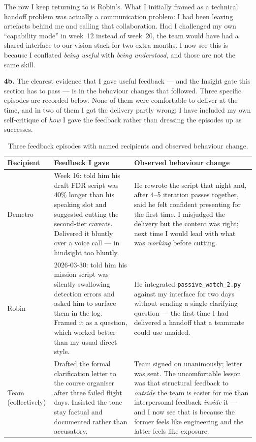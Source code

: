 The row I keep returning to is Robin's. What I initially framed as a technical handoff problem was actually a communication problem: I had been leaving artefacts behind me and calling that collaboration. Had I challenged my own ``capability mode'' in week~12 instead of week~20, the team would have had a shared interface to our vision stack for two extra months. I now see this is because I conflated \emph{being useful} with \emph{being understood}, and those are not the same skill.

\textbf{4b.} The clearest evidence that I gave useful feedback --- and the Insight gate this section has to pass --- is in the behaviour changes that followed. Three specific episodes are recorded below. None of them were comfortable to deliver at the time, and in two of them I got the delivery partly wrong; I have included my own self-critique of \emph{how} I gave the feedback rather than dressing the episodes up as successes.

\begin{table}[h]
\small
\centering
\begin{tabular}{@{}p{2cm}p{5cm}p{6.5cm}@{}}
\toprule
\textbf{Recipient} & \textbf{Feedback I gave} & \textbf{Observed behaviour change} \\
\midrule
Demetro & Week 16: told him his draft FDR script was 40\% longer than his speaking slot and suggested cutting the second-tier caveats. Delivered it bluntly over a voice call --- in hindsight too bluntly. & He rewrote the script that night and, after 4--5 iteration passes together, said he felt confident presenting for the first time. I misjudged the delivery but the content was right; next time I would lead with what was \emph{working} before cutting. \\
Robin & 2026-03-30: told him his mission script was silently swallowing detection errors and asked him to surface them in the log. Framed it as a question, which worked better than my usual direct style. & He integrated \texttt{passive\_watch\_2.py} against my interface for two days without sending a single clarifying question --- the first time I had delivered a handoff that a teammate could use unaided. \\
Team (collectively) & Drafted the formal clarification letter to the course organiser after three failed flight days. Insisted the tone stay factual and documented rather than accusatory. & Team signed on unanimously; letter was sent. The uncomfortable lesson was that structural feedback to \emph{outside} the team is easier for me than interpersonal feedback \emph{inside} it --- and I now see that is because the former feels like engineering and the latter feels like exposure. \\
\bottomrule
\end{tabular}
\caption{Three feedback episodes with named recipients and observed behaviour change.}
\end{table}

